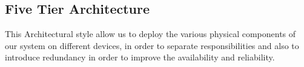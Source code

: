 \subsection{Five Tier Architecture}
\label{subsect:Five Tier Architecture}
This Architectural style allow us to deploy the various physical components of our system on different devices, in order to separate responsibilities and also to introduce redundancy in order to improve the availability and reliability. 
\newpage
